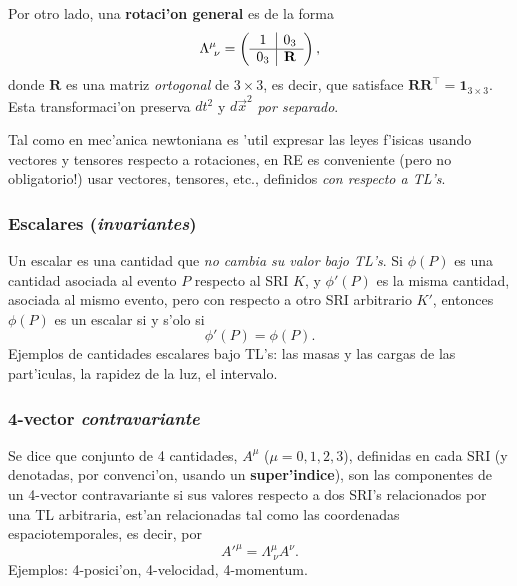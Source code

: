Por otro lado, una \textbf{rotaci'on general} es de la forma
\begin{equation}
\Lambda^\mu_{\ \nu}=\left(
\begin{array}[c]{c|c}
1 & 0_3 \\
\hline
0_3 & \mathbf{R}
\end{array}
\right), \label{rotgen}
\end{equation}
donde $\mathbf{R}$ es una matriz \textit{ortogonal} de $3\times 3$, es decir, que satisface $\mathbf{R}\mathbf{R}^\top=\mathbf{1}_{3\times 3}$. Esta transformaci'on preserva $dt^2$ y $d\vec{x}^2$ \textit{por separado}.

Tal como en mec'anica newtoniana es 'util expresar las leyes f'isicas usando
vectores y tensores respecto a rotaciones, en RE es conveniente (pero no
obligatorio!) usar vectores, tensores, etc., definidos \textit{con respecto  a TL's}.

\subsubsection{Escalares (\textit{invariantes})}
Un escalar es una cantidad que \textit{no cambia su valor bajo TL's}. Si $\phi(P)$ es una cantidad asociada al evento $P$ respecto al SRI $K$, y $\phi'(P)$ es la misma cantidad, asociada al mismo evento, pero con respecto a otro SRI arbitrario $K'$, entonces $\phi(P)$ es un escalar si y s'olo si
\begin{equation}
\phi'(P)=\phi(P).
\end{equation}
Ejemplos de cantidades escalares bajo TL's: las masas y las cargas de
las part'iculas, la rapidez de la luz, el intervalo.

\subsubsection{4-vector \textit{contravariante}}
Se dice que conjunto de 4 cantidades, $A^\mu$ ($\mu=0,1,2,3$), definidas en cada SRI (y denotadas, por convenci'on, usando un \textbf{super'indice}), son las componentes de un 4-vector contravariante si sus valores respecto a dos SRI's relacionados por una TL arbitraria, est'an relacionadas tal como las coordenadas espaciotemporales, es decir, por
\begin{equation}
A'^\mu=\Lambda^\mu_{\ \nu} A^\nu .
\end{equation}
Ejemplos: 4-posici'on, 4-velocidad, 4-momentum.

